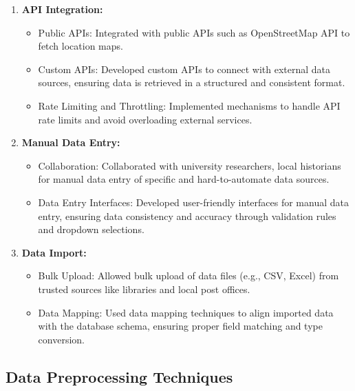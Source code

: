 \begin{enumerate}
    \item \textbf{API Integration:}
    \begin{itemize}
        \item Public APIs: Integrated with public APIs such as OpenStreetMap API to fetch location maps.
        \item Custom APIs: Developed custom APIs to connect with external data sources, ensuring data is retrieved in a structured and consistent format.
        \item Rate Limiting and Throttling: Implemented mechanisms to handle API rate limits and avoid overloading external services.
    \end{itemize}
    
    \item \textbf{Manual Data Entry:}
    \begin{itemize}
        \item Collaboration: Collaborated with university researchers, local historians for manual data entry of specific and hard-to-automate data sources.
        \item Data Entry Interfaces: Developed user-friendly interfaces for manual data entry, ensuring data consistency and accuracy through validation rules and dropdown selections.
    \end{itemize}
    
    \item \textbf{Data Import:}
    \begin{itemize}
        \item Bulk Upload: Allowed bulk upload of data files (e.g., CSV, Excel) from trusted sources like libraries and local post offices.
        \item Data Mapping: Used data mapping techniques to align imported data with the database schema, ensuring proper field matching and type conversion.
    \end{itemize}
\end{enumerate}

\subsection{Data Preprocessing Techniques}

